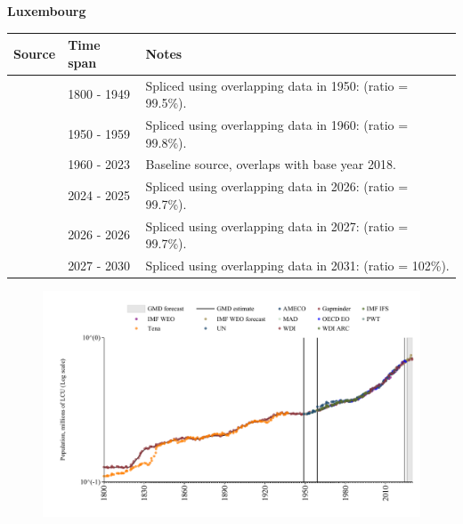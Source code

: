 \documentclass[12pt,a4paper,landscape]{article}
\begin{document}
\begin{adjustbox}{max totalsize={\paperwidth}{\paperheight},center}
\begin{minipage}[t][\textheight][t]{\textwidth}
\vspace*{0.5cm}
{}
\begin{center}
{\Large\bfseries Luxembourg}
\end{center}
\vspace{0.5cm}
\begin{table}[H]
\centering
\small
\begin{tabular}{|l|l|l|}
\hline
\textbf{Source} & \textbf{Time span} & \textbf{Notes} \\
\hline
\rowcolor{white}\cite{Gapminder}& 1800 - 1949 &Spliced using overlapping data in 1950: (ratio = 99.5\%).\\
\rowcolor{lightgray}\cite{IMF_IFS}& 1950 - 1959 &Spliced using overlapping data in 1960: (ratio = 99.8\%).\\
\rowcolor{white}\cite{WDI}& 1960 - 2023 &Baseline source, overlaps with base year 2018.\\
\rowcolor{lightgray}\cite{OECD_EO}& 2024 - 2025 &Spliced using overlapping data in 2026: (ratio = 99.7\%).\\
\rowcolor{white}\cite{AMECO}& 2026 - 2026 &Spliced using overlapping data in 2027: (ratio = 99.7\%).\\
\rowcolor{lightgray}\cite{Gapminder}& 2027 - 2030 &Spliced using overlapping data in 2031: (ratio = 102\%).\\
\hline
\end{tabular}
\end{table}
\begin{figure}[H]
\centering
\includegraphics[width=\textwidth,height=0.6\textheight,keepaspectratio]{graphs/LUX_pop.pdf}
\end{figure}
\end{minipage}
\end{adjustbox}
\end{document}
